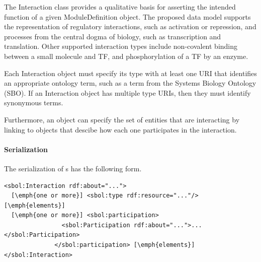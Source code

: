 The Interaction class provides a qualitative basis for asserting the intended function of a given ModuleDefinition object. The proposed data model supports the representation of regulatory interactions, such as activation or repression, and processes from the central dogma of biology, such as transcription and translation. Other supported interaction types include non-covalent binding between a small molecule and TF, and phosphorylation of a TF by an enzyme. 

Each Interaction object must specify its type with at least one URI that identifies an appropriate ontology term, such as a term from the Systems Biology Ontology (SBO). If an Interaction object has multiple type URIs, then they must identify synonymous terms. 


Furthermore, an object can specify the set of  entities that are interacting by linking to  objects that descibe how each one participates in the interaction.

\paragraph{Serialization}

The serialization of s has the following form.
\begin{lstlisting}
<sbol:Interaction rdf:about="...">
  [\emph{one or more}] <sbol:type rdf:resource="..."/> [\emph{elements}]
  [\emph{one or more}] <sbol:participation>
                <sbol:Participation rdf:about="...">...</sbol:Participation>
              </sbol:participation> [\emph{elements}]
</sbol:Interaction>
\end{lstlisting}

